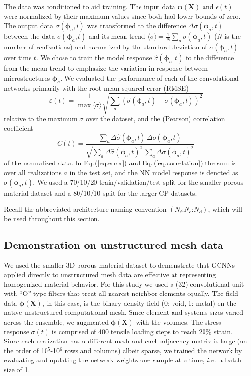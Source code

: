 \documentclass[12pt,reqno]{article}
\newcommand{\ADD}[1]{{#1}}
\newcommand{\eref}[1]{Eq.\,(\ref{#1})}
\newcommand{\ie}{{\it i.e.}\!\, }
\newcommand{\Xb}{\mathbf{X}}
\newcommand{\phib}{{\boldsymbol{\phi}}}
\newcommand{\arch}[3]{({#1}\text{:}{#2}\text{:}{#3})}
\newcommand{\error}{\varepsilon}
\newcommand{\corr}{C}
\newcommand{\Nf}{N_\text{f}}
\newcommand{\Nc}{N_\text{c}}
\newcommand{\Nd}{N_\text{d}}
\begin{document}
The data was conditioned to aid training.
The input data $\phib(\Xb)$ and $\epsilon(t)$ were normalized by their maximum values since both had lower bounds of zero.
The output data $\sigma(\phib_a,t)$ was transformed to the difference $\Delta \sigma(\phib_a,t)$ between the data $\sigma(\phib_a,t)$ and its mean trend $\langle \sigma \rangle = \frac{1}{N} \sum_a {\sigma}(\phib_a,t)$ ($N$ is the number of realizations) and normalized by the standard deviation of $\sigma(\phib_a,t)$  over time $t$.
We chose to train the model response $\hat{\sigma}(\phib_a,t)$ to the difference from the mean trend to emphasize the variation in response between microstructures $\phib_a$.
We evaluated the performance of each of the convolutional networks primarily with the root mean squared error (RMSE)
\begin{equation} \label{eq:error}
\error(t) = \frac{1}{\max \langle \sigma \rangle} \sqrt{
{ \sum_a (\hat{\sigma}(\phib_a,t) - \sigma(\phib_a,t) )^2 }
}
\end{equation}
relative to the maximum $\sigma$ over the dataset,
and the (Pearson) correlation coefficient
\begin{equation} \label{eq:correlation}
\corr(t)        = \frac{\sum_a \Delta \hat{\sigma}(\phib_a,t) \, \Delta \sigma(\phib_a,t) }
{ \sqrt{ \sum_a \Delta \hat{\sigma}(\phib_a,t)^2 \
\sum_a \Delta     {\sigma}(\phib_a,t)^2 }}
\end{equation}
of the normalized data.
In \eref{eq:error} and \eref{eq:correlation} the sum is over all realizations $a$ in the test set, and the NN model response is denoted as $\hat{\sigma}(\phib_a,t)$.
We used a 70/10/20 train/validation/test split for the smaller porous material dataset and a 80/10/10 split for the larger CP datasets.

Recall the abbreviated architecture naming convention $\arch{\Nf}{\Nc}{\Nd}$, which will be used throughout this section.


\subsection{Demonstration on unstructured mesh data} \label{sec:unstructured}

\ADD{
We used the smaller 3D porous material dataset to demonstrate that GCNNs applied directly to unstructured mesh data are effective at representing homogenized material behavior.
For this study we used a \arch{32}{4}{2} convolutional unit with ``O'' type filters that treat all nearest neighbor elements equally.
The field data $\phib(\Xb)$, in this case, is the binary density field (0: void, 1: metal) on the native unstructured computational mesh.
Since element and systems sizes varied across the ensemble, we augmented $\phib(\Xb)$ with the volumes.
The stress response $\bar{\sigma}(t)$ is comprised of 400 tensile loading steps to reach 20\% strain.
Since each realization has a different mesh and each adjacency matrix is large (on the order of 10$^5$-10$^6$ rows and columns)  albeit sparse, we trained the network by evaluating and updating the network weights one sample at a time, \ie a batch size of 1.
}
\end{document}
